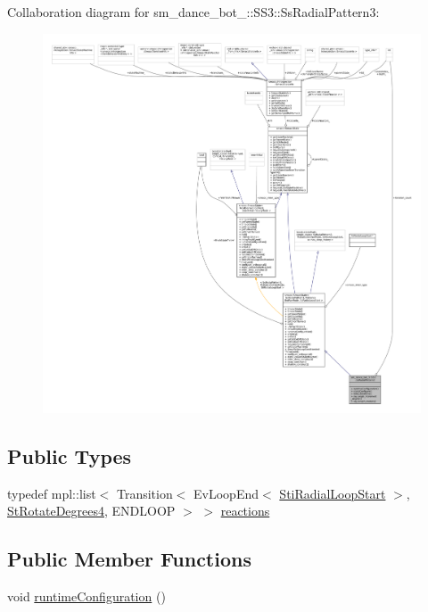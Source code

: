 Collaboration diagram for sm\+\_\+dance\+\_\+bot\+\_\+:\+:S\+S3\+:\+:Ss\+Radial\+Pattern3\+:
\nopagebreak
\begin{figure}[H]
\begin{center}
\leavevmode
\includegraphics[width=350pt]{structsm__dance__bot__3_1_1SS3_1_1SsRadialPattern3__coll__graph}
\end{center}
\end{figure}
\subsection*{Public Types}
\begin{DoxyCompactItemize}
\item 
typedef mpl\+::list$<$ Transition$<$ Ev\+Loop\+End$<$ \hyperlink{structsm__dance__bot__3_1_1radial__motion__states_1_1StiRadialLoopStart}{Sti\+Radial\+Loop\+Start} $>$, \hyperlink{structsm__dance__bot__3_1_1StRotateDegrees4}{St\+Rotate\+Degrees4}, E\+N\+D\+L\+O\+OP $>$ $>$ \hyperlink{structsm__dance__bot__3_1_1SS3_1_1SsRadialPattern3_a873da3cae48e32c03b8035d1a970013d}{reactions}
\end{DoxyCompactItemize}
\subsection*{Public Member Functions}
\begin{DoxyCompactItemize}
\item 
void \hyperlink{structsm__dance__bot__3_1_1SS3_1_1SsRadialPattern3_a42ae6b2dbc9b3392f1101441646167c7}{runtime\+Configuration} ()
\end{DoxyCompactItemize}
